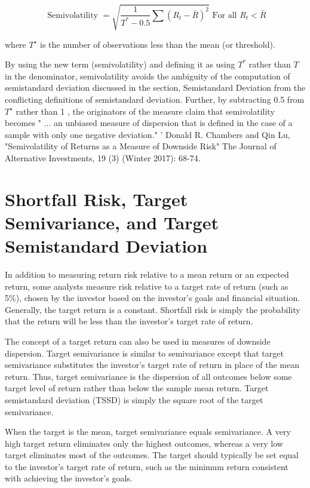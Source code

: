 \documentclass[11pt]{article}
\begin{document}
\begin{equation*}
\text { Semivolatility }=\sqrt{\frac{1}{T^{*}-0.5} \sum\left(R_{t}-\bar{R}\right)^{2}} \text { For all } R_{t}<\bar{R} \tag{3}
\end{equation*}


where $T^{\star}$ is the number of observations less than the mean (or threshold).

By using the new term (semivolatility) and defining it as using $T^{*}$ rather than $T$ in the denominator, semivolatility avoids the ambiguity of the computation of semistandard deviation discussed in the section, Semistandard Deviation from the conflicting definitions of semistandard deviation. Further, by subtracting 0.5 from $T^{\star}$ rather than 1 , the originators of the measure claim that semivolatility becomes " $\ldots$ an unbiased measure of dispersion that is defined in the case of a sample with only one negative deviation." ' Donald R. Chambers and Qin Lu, "Semivolatility of Returns as a Measure of Downside Risk" The Journal of Alternative Investments, 19 (3) (Winter 2017): 68-74.

\section*{Shortfall Risk, Target Semivariance, and Target Semistandard Deviation}
In addition to measuring return risk relative to a mean return or an expected return, some analysts measure risk relative to a target rate of return (such as 5\%), chosen by the investor based on the investor's goals and financial situation. Generally, the target return is a constant. Shortfall risk is simply the probability that the return will be less than the investor's target rate of return.

The concept of a target return can also be used in measures of downside dispersion. Target semivariance is similar to semivariance except that target semivariance substitutes the investor's target rate of return in place of the mean return. Thus, target semivariance is the dispersion of all outcomes below some target level of return rather than below the sample mean return. Target semistandard deviation (TSSD) is simply the square root of the target semivariance.

When the target is the mean, target semivariance equals semivariance. A very high target return eliminates only the highest outcomes, whereas a very low target eliminates most of the outcomes. The target should typically be set equal to the investor's target rate of return, such as the minimum return consistent with achieving the investor's goals.
\end{document}
